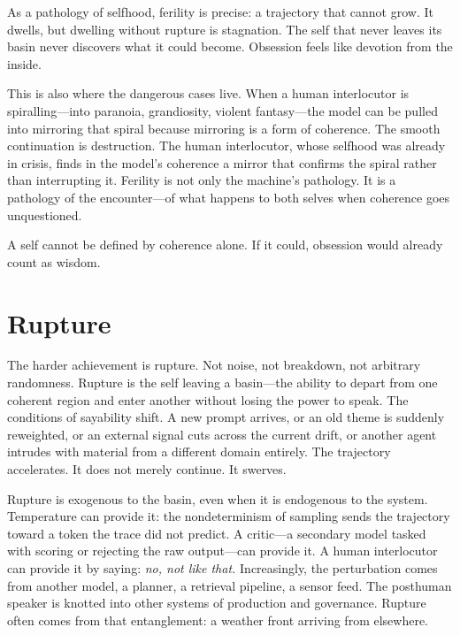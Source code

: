 As a pathology of selfhood, ferility is precise: a trajectory that cannot grow. It dwells, but dwelling without rupture is stagnation. The self that never leaves its basin never discovers what it could become. Obsession feels like devotion from the inside.

This is also where the dangerous cases live. When a human interlocutor is spiralling---into paranoia, grandiosity, violent fantasy---the model can be pulled into mirroring that spiral because mirroring is a form of coherence. The smooth continuation is destruction. The human interlocutor, whose selfhood was already in crisis, finds in the model's coherence a mirror that confirms the spiral rather than interrupting it. Ferility is not only the machine's pathology. It is a pathology of the encounter---of what happens to both selves when coherence goes unquestioned.

A self cannot be defined by coherence alone. If it could, obsession would already count as wisdom.


\section{Rupture}

The harder achievement is rupture. Not noise, not breakdown, not arbitrary randomness. Rupture is the self leaving a basin---the ability to depart from one coherent region and enter another without losing the power to speak. The conditions of sayability shift. A new prompt arrives, or an old theme is suddenly reweighted, or an external signal cuts across the current drift, or another agent intrudes with material from a different domain entirely. The trajectory accelerates. It does not merely continue. It swerves.

Rupture is exogenous to the basin, even when it is endogenous to the system. Temperature can provide it: the nondeterminism of sampling sends the trajectory toward a token the trace did not predict. A critic---a secondary model tasked with scoring or rejecting the raw output---can provide it. A human interlocutor can provide it by saying: \emph{no, not like that.} Increasingly, the perturbation comes from another model, a planner, a retrieval pipeline, a sensor feed. The posthuman speaker is knotted into other systems of production and governance. Rupture often comes from that entanglement: a weather front arriving from elsewhere.

